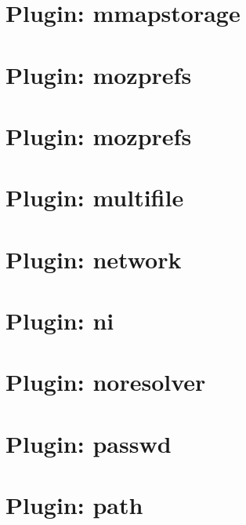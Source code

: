 \let\mypdfximage\pdfximage\def\pdfximage{\immediate\mypdfximage}\documentclass[twoside]{book}
\newcommand{\+}{\discretionary{\mbox{\scriptsize$\hookleftarrow$}}{}{}}
\begin{document}
\chapter{Plugin\+: mmapstorage}
\label{md_src_plugins_mmapstorage_shelltests}

\chapter{Plugin\+: mozprefs}
\label{md_src_plugins_mozprefs_autoconfig_README}

\chapter{Plugin\+: mozprefs}
\label{md_src_plugins_mozprefs_README}

\chapter{Plugin\+: multifile}
\label{md_src_plugins_multifile_README}

\chapter{Plugin\+: network}
\label{md_src_plugins_network_README}

\chapter{Plugin\+: ni}
\label{md_src_plugins_ni_README}

\chapter{Plugin\+: noresolver}
\label{md_src_plugins_noresolver_README}

\chapter{Plugin\+: passwd}
\label{md_src_plugins_passwd_README}

\chapter{Plugin\+: path}
\label{md_src_plugins_path_README}

\end{document}
